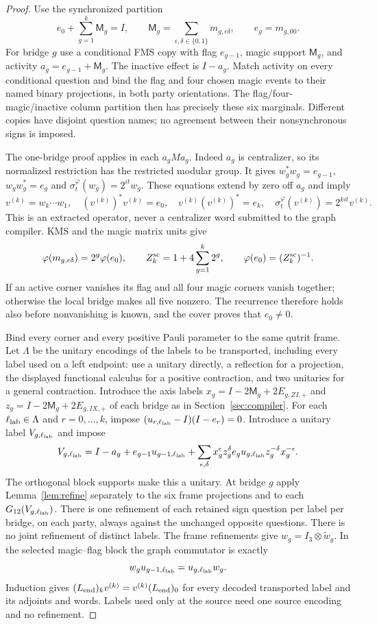 \begin{proof}
Use the synchronized partition
\[
 e_0+\sum_{g=1}^k \mathsf M_g=I,\qquad
 \mathsf M_g=\sum_{\epsilon,\delta\in\{0,1\}}m_{g,\epsilon\delta},\qquad e_g=m_{g,00}.
\]
For bridge $g$ use a conditional FMS copy with flag $e_{g-1}$,
magic support $\mathsf M_g$, and activity $a_g=e_{g-1}+\mathsf M_g$.
The inactive effect is $I-a_g$. Match activity on every conditional
question and bind the flag and four chosen magic events to their
named binary projections, in both party orientations. The
flag/four-magic/inactive column partition then has precisely these
six marginals. Different copies have disjoint question names;
no agreement between their nonsynchronous signs is imposed.

The one-bridge proof applies in each $a_gMa_g$. Indeed $a_g$ is
centralizer, so its normalized restriction has the restricted
modular group. It gives $w_g^*w_g=e_{g-1}$, $w_gw_g^*=e_g$ and
$\sigma_t^\varphi(w_g)=2^{it}w_g$. These equations extend by zero
off $a_g$ and imply
\[
 v^{(k)}=w_k\cdots w_1,\quad
 (v^{(k)})^*v^{(k)}=e_0,\quad
 v^{(k)}(v^{(k)})^*=e_k,\quad
 \sigma_t^\varphi(v^{(k)})=2^{kit}v^{(k)}.
\]
This is an extracted operator, never a centralizer word submitted
to the graph compiler. KMS and the magic matrix units give
\[
 \varphi(m_{g,\epsilon\delta})=2^g\varphi(e_0),\qquad
 Z_k^{\rm sc}=1+4\sum_{g=1}^k2^g,\qquad \varphi(e_0)=(Z_k^{\rm sc})^{-1}.
\]
If an active corner vanishes its flag and all four magic corners
vanish together; otherwise the local bridge makes all five
nonzero. The recurrence therefore holds also before nonvanishing
is known, and the cover proves that $e_0\ne0$.

Bind every corner and every positive Pauli parameter to the same
qutrit frame. Let $\Lambda$ be the unitary encodings of the labels to be transported,
including every label used on a left endpoint: use a unitary directly,
a reflection for a projection, the displayed functional calculus for a
positive contraction, and two unitaries for a general contraction.
Introduce the axis labels $x_g=I-2\mathsf M_g+2E_{g,ZI,+}$ and
$z_g=I-2\mathsf M_g+2E_{g,IX,+}$ of each bridge as in
Section~\ref{sec:compiler}. For each $\ell_{\rm lab}\in\Lambda$
and $r=0,\ldots,k$, impose
$(u_{r,\ell_{\rm lab}}-I)(I-e_r)=0$. Introduce a unitary label $V_{g,\ell_{\rm lab}}$ and impose
\[
 V_{g,\ell_{\rm lab}}=I-a_g+e_{g-1}u_{g-1,\ell_{\rm lab}}
  +\sum_{\epsilon,\delta}x_g^\epsilon z_g^\delta e_gu_{g,\ell_{\rm lab}}z_g^{-\delta}x_g^{-\epsilon}.
\]
The orthogonal block supports make this a unitary. At bridge $g$
apply Lemma~\ref{lem:refine} separately to the six frame projections
and to each $G_{12}(V_{g,\ell_{\rm lab}})$. There is one refinement of each
retained sign question per label per bridge, on each party, always
against the unchanged opposite questions. There is no joint
refinement of distinct labels. The frame refinements give
$w_g=I_3\otimes\widetilde w_g$. In the selected magic--flag block
the graph commutator is exactly
\[
 w_gu_{g-1,\ell_{\rm lab}}=u_{g,\ell_{\rm lab}}w_g.
\]
Induction gives $(L_{\rm end})_kv^{(k)}=v^{(k)}(L_{\rm end})_0$ for every decoded transported
label and its adjoints and words. Labels used only at the source
need one source encoding and no refinement.


\end{proof}
